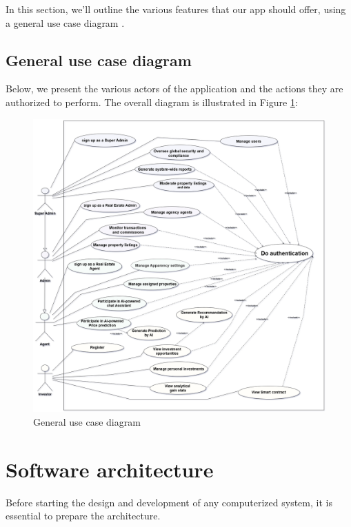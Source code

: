 In this section, we'll outline the various features that our app should offer, using a general use case diagram \cite{CockburnUML2002}.

\subsection{General use case diagram}

Below, we present the various actors of the application and the actions they are authorized to perform.
The overall diagram is illustrated in Figure \ref{fig:use-case-diagram}:
\newpage
\begin{figure}[htbp]
    \centering
    \includegraphics[width=1.03\textwidth]{images/diagram de case d utilisation general.png}
    \caption{General use case diagram}
    \label{fig:use-case-diagram}
\end{figure}
\section{Software architecture}

Before starting the design and development of any computerized system, it is essential to prepare the architecture.

